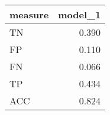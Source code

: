 \begin{tabular}{lr}
\toprule
measure &  model\_1 \\
\midrule
     TN &    0.390 \\
     FP &    0.110 \\
     FN &    0.066 \\
     TP &    0.434 \\
    ACC &    0.824 \\
\bottomrule
\end{tabular}

